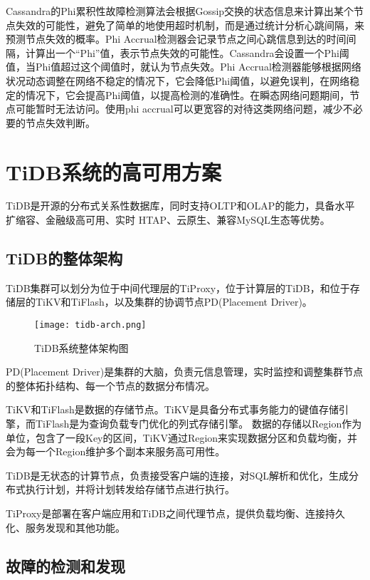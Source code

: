 Cassandra的Phi累积性故障检测算法会根据Gossip交换的状态信息来计算出某个节点失效的可能性，避免了简单的地使用超时机制，而是通过统计分析心跳间隔，来预测节点失效的概率。Phi Accrual检测器会记录节点之间心跳信息到达的时间间隔，计算出一个“Phi”值，表示节点失效的可能性。Cassandra会设置一个Phi阈值，当Phi值超过这个阈值时，就认为节点失效。Phi Accrual检测器能够根据网络状况动态调整在网络不稳定的情况下，它会降低Phi阈值，以避免误判，在网络稳定的情况下，它会提高Phi阈值，以提高检测的准确性。在瞬态网络问题期间，节点可能暂时无法访问。使用phi accrual可以更宽容的对待这类网络问题，减少不必要的节点失效判断。


\section{TiDB系统的高可用方案}
TiDB\cite{huang2020tidb}是开源的分布式关系性数据库，同时支持OLTP和OLAP的能力，具备水平扩缩容、金融级高可用、实时 HTAP、云原生、兼容MySQL生态等优势。

\subsection{TiDB的整体架构}

TiDB集群可以划分为位于中间代理层的TiProxy，位于计算层的TiDB，和位于存储层的TiKV和TiFlash，以及集群的协调节点PD(Placement Driver)。

\begin{figure}
  \centering
  \texttt{[image: tidb-arch.png]}
  \caption{TiDB系统整体架构图}
  \label{fig:tidb-arch}
\end{figure}

PD(Placement Driver)是集群的大脑，负责元信息管理，实时监控和调整集群节点的整体拓扑结构、每一个节点的数据分布情况。

TiKV和TiFlash是数据的存储节点。TiKV是具备分布式事务能力的键值存储引擎，而TiFlash是为查询负载专门优化的列式存储引擎。
数据的存储以Region作为单位，包含了一段Key的区间，TiKV通过Region来实现数据分区和负载均衡，并会为每一个Region维护多个副本来服务高可用性。

TiDB是无状态的计算节点，负责接受客户端的连接，对SQL解析和优化，生成分布式执行计划，并将计划转发给存储节点进行执行。

TiProxy是部署在客户端应用和TiDB之间代理节点，提供负载均衡、连接持久化、服务发现和其他功能。


\subsection{故障的检测和发现}

